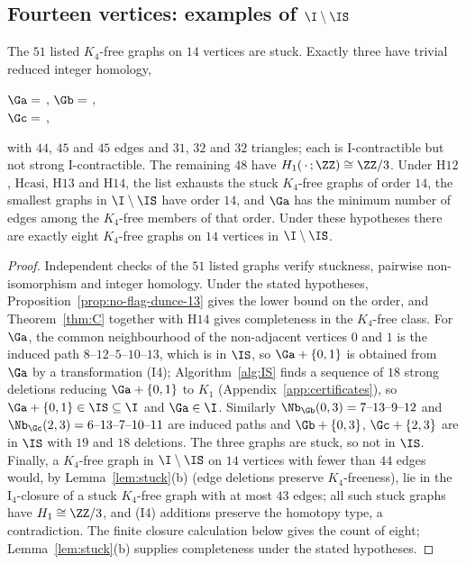 \subsection{\texorpdfstring{Fourteen vertices: examples of $\I\setminus\IS$}{Fourteen vertices: examples of I minus I-S}}\label{sec:fourteen}

\begin{theorem}\label{thm:B}
The $51$ listed $K_4$-free graphs on $14$ vertices are stuck. Exactly three have trivial reduced integer homology,
\begin{center}\small
$\Ga=$ ,\qquad
$\Gb=$ \gsix{M?B@thku?\textasciitilde{}Lylk\}[?},\\[2pt]
$\Gc=$ ,
\end{center}
with $44$, $45$ and $45$ edges and $31$, $32$ and $32$ triangles; each is I-contractible but not strong I-contractible. The remaining $48$ have $H_1(\,\cdot\,;\ZZ)\cong\ZZ/3$. Under $\mathrm{H12}$, $\mathrm{Hcasi}$, $\mathrm{H13}$ and $\mathrm{H14}$, the list exhausts the stuck $K_4$-free graphs of order $14$, the smallest graphs in $\I\setminus\IS$ have order $14$, and $\Ga$ has the minimum number of edges among the $K_4$-free members of that order. Under these hypotheses there are exactly eight $K_4$-free graphs on $14$ vertices in $\I\setminus\IS$.
\end{theorem}

\begin{proof}
Independent checks of the $51$ listed graphs verify stuckness, pairwise non-isomorphism and integer homology. Under the stated hypotheses, Proposition~\ref{prop:no-flag-dunce-13} gives the lower bound on the order, and Theorem~\ref{thm:C} together with $\mathrm{H14}$ gives completeness in the $K_4$-free class. For $\Ga$, the common neighbourhood of the non-adjacent vertices $0$ and $1$ is the induced path $8\text{--}12\text{--}5\text{--}10\text{--}13$, which is in $\IS$, so $\Ga+\{0,1\}$ is obtained from $\Ga$ by a transformation (I4); Algorithm~\ref{alg:IS} finds a sequence of $18$ strong deletions reducing $\Ga+\{0,1\}$ to $K_1$ (Appendix~\ref{app:certificates}), so $\Ga+\{0,1\}\in\IS\subseteq\I$ and $\Ga\in\I$. Similarly $\Nb_{\Gb}(0,3)=7\text{--}13\text{--}9\text{--}12$ and $\Nb_{\Gc}(2,3)=6\text{--}13\text{--}7\text{--}10\text{--}11$ are induced paths and $\Gb+\{0,3\}$, $\Gc+\{2,3\}$ are in $\IS$ with $19$ and $18$ deletions. The three graphs are stuck, so not in $\IS$. Finally, a $K_4$-free graph in $\I\setminus\IS$ on $14$ vertices with fewer than $44$ edges would, by Lemma~\ref{lem:stuck}(b) (edge deletions preserve $K_4$-freeness), lie in the $\mathrm{I}_4$-closure of a stuck $K_4$-free graph with at most $43$ edges; all such stuck graphs have $H_1\cong\ZZ/3$, and (I4) additions preserve the homotopy type, a contradiction. The finite closure calculation below gives the count of eight; Lemma~\ref{lem:stuck}(b) supplies completeness under the stated hypotheses.
\end{proof}


